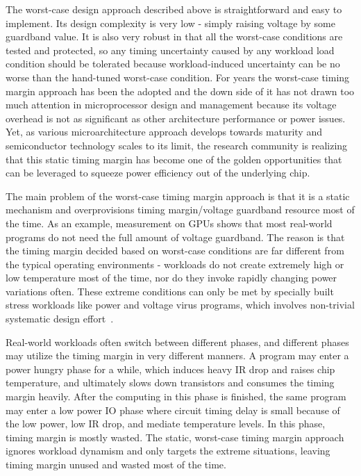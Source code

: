 The worst-case design approach described above is straightforward and easy to implement. Its design complexity is very low - simply raising voltage by some guardband value. It is also very robust in that all the worst-case conditions are tested and protected, so any timing uncertainty caused by any workload load condition should be tolerated because workload-induced uncertainty can be no worse than the hand-tuned worst-case condition. For years the worst-case timing margin approach has been the adopted and the down side of it has not drawn too much attention in microprocessor design and management because its voltage overhead is not as significant as other architecture performance or power issues. Yet, as various microarchitecture approach develops towards maturity and semiconductor technology scales to its limit, the research community is realizing that this static timing margin has become one of the golden opportunities that can be leveraged to squeeze power efficiency out of the underlying chip.

The main problem of the worst-case timing margin approach is that it is a static mechanism and overprovisions timing margin/voltage guardband resource most of the time. As an example, measurement on GPUs shows that most real-world programs do not need the full amount of voltage guardband. The reason is that the timing margin decided based on worst-case conditions are far different from the typical operating environments - workloads do not create extremely high or low temperature most of the time, nor do they invoke rapidly changing power variations often. These extreme conditions can only be met by specially built stress workloads like power and voltage virus programs, which involves non-trivial systematic design effort~\cite{kim2012audit,bertran2014voltage,bertran2012systematic}.

Real-world workloads often switch between different phases, and different phases may utilize the timing margin in very different manners. A program may enter a power hungry phase for a while, which induces heavy IR drop and raises chip temperature, and ultimately slows down transistors and consumes the timing margin heavily. After the computing in this phase is finished, the same program may enter a low power IO phase where circuit timing delay is small because of the low power, low IR drop, and mediate temperature levels. In this phase, timing margin is mostly wasted. The static, worst-case timing margin approach ignores workload dynamism and only targets the extreme situations, leaving timing margin unused and wasted most of the time. 

